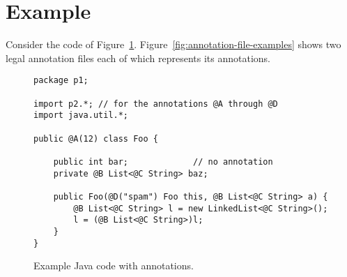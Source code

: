 \documentclass{article}
\begin{document}
\section{Example\label{example}}

Consider the code of Figure~\ref{fig:java-example}.
Figure~\ref{fig:annotation-file-examples} shows two legal annotation files
each of which represents its annotations.


\begin{figure}
\begin{verbatim}
package p1;

import p2.*; // for the annotations @A through @D
import java.util.*;

public @A(12) class Foo {

    public int bar;             // no annotation
    private @B List<@C String> baz;

    public Foo(@D("spam") Foo this, @B List<@C String> a) {
        @B List<@C String> l = new LinkedList<@C String>();
        l = (@B List<@C String>)l;
    }
}
\end{verbatim}
\caption{Example Java code with annotations.}
\label{fig:java-example}
\end{figure}
\end{document}
